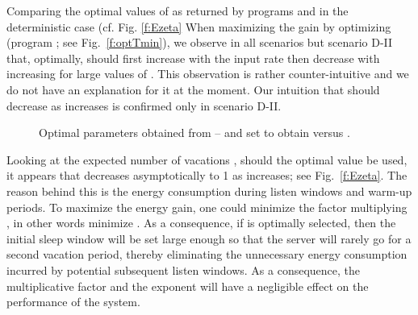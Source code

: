 \documentclass[journal]{IEEEtran}
\begin{document}
Comparing the optimal values of  as returned by programs  and  in the deterministic case (cf. Fig. \ref{f:Ezeta} When maximizing the gain by optimizing  (program ; see Fig.~\ref{f:optTmin}), we observe in all scenarios but scenario D-II that, optimally,  should first increase with the input rate  then decrease with increasing  for large values of . This observation is rather counter-intuitive and we do not have an explanation for it at the moment. Our intuition that  should decrease as  increases is confirmed only in scenario D-II.

\begin{figure}[tb]
\begin{center}
\hspace{1em}
\hspace{1em}

\hspace{1em}
\caption{ Optimal parameters obtained from -- and set to obtain  versus . \label{f:Ezeta}\label{f:valuesOptim}}

\end{center}
\end{figure}
Looking at the expected number of vacations , should the optimal value  be used,  it appears that  decreases asymptotically to 1 as  increases; see Fig.~\ref{f:Ezeta}. The reason behind this is the energy consumption during listen windows and warm-up periods. To maximize the energy gain, one could minimize the factor multiplying , in other words minimize 
. As a consequence, if  is optimally selected, then the initial sleep window will be set large enough so that the server will rarely go for a second vacation period, thereby eliminating the unnecessary energy consumption incurred by potential subsequent listen windows. As a consequence, the multiplicative factor  and the exponent  will have a negligible effect on the performance of the system.
\end{document}
